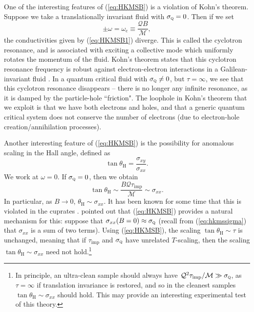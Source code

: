 \documentclass[10pt, oneside]{book}
\begin{document}
\begin{doublespace}
One of the interesting features of (\ref{eq:HKMSB}) is a violation of Kohn's theorem.  Suppose we take a translationally invariant fluid with $\sigma_{\textsc{q}}=0$.   Then if we set \begin{equation}
\pm \omega = \omega_{\mathrm{c}} \equiv \frac{\mathcal{Q}B}{\mathcal{M}},
\end{equation} 
the conductivities given by (\ref{eq:HKMSB1}) diverge.   This is called the cyclotron resonance, and is associated with exciting a collective mode which uniformly rotates the momentum of the fluid. Kohn's theorem states that this cyclotron resonance frequency is robust against electron-electron interactions in a Galilean-invariant fluid \cite{Kohn1961}.  In a quantum critical fluid with $\sigma_{\textsc{q}}\ne0$, but $\tau=\infty$, we see that this cyclotron resonance disappears -- there is no longer any infinite resonance, as it is damped by the particle-hole ``friction". The loophole in Kohn's theorem that we exploit is that we have both electrons and holes, and that a generic quantum critical system does not conserve the number of electrons (due to electron-hole creation/annihilation processes).

Another interesting feature of (\ref{eq:HKMSB}) is the possibility for anomalous scaling in the Hall angle, defined as \begin{equation}
\tan \theta_{\mathrm{H}} = \frac{\sigma_{xy}}{\sigma_{xx}}.
\end{equation}
We work at $\omega=0$.  If $\sigma_{\textsc{q}} = 0$,  then we obtain \begin{equation}
\tan \theta_{\mathrm{H}} \sim \frac{B\mathcal{Q} \tau_{\mathrm{imp}}}{\mathcal{M}} \sim \sigma_{xx}.  \label{eq:tanth}
\end{equation}
In particular, as $B\rightarrow 0$,  $\theta_{\mathrm{H}} \sim \sigma_{xx}$.   It has been known for some time that this is violated in the cuprates \cite{Chien1991}.   \cite{Blake:2014yla} pointed out that (\ref{eq:HKMSB}) provides a natural mechanism for this:  suppose that $\sigma_{xx}(B=0)\approx\sigma_{\textsc{q}}$ (recall from (\ref{eq:hkmssigma}) that $\sigma_{xx}$ is a sum of two terms).   Using (\ref{eq:HKMSB}), the scaling $\tan \theta_{\mathrm{H}} \sim \tau$ is unchanged,  meaning that if $\tau_{\mathrm{imp}}$ and $\sigma_{\textsc{q}}$ have unrelated $T$-scaling,  then the scaling $\tan\theta_{\mathrm{H}} \sim \sigma_{xx}$ need not hold.\footnote{In principle, an ultra-clean sample should always have $\mathcal{Q}^2\tau_{\mathrm{imp}}/\mathcal{M} \gg \sigma_{\textsc{q}}$,  as $\tau=\infty$ if translation invariance is restored, and so in the cleanest samples $\tan \theta_{\mathrm{H}} \sim \sigma_{xx}$ should hold.   This may provide an interesting experimental test of this theory.}


\end{doublespace}
\end{document}

